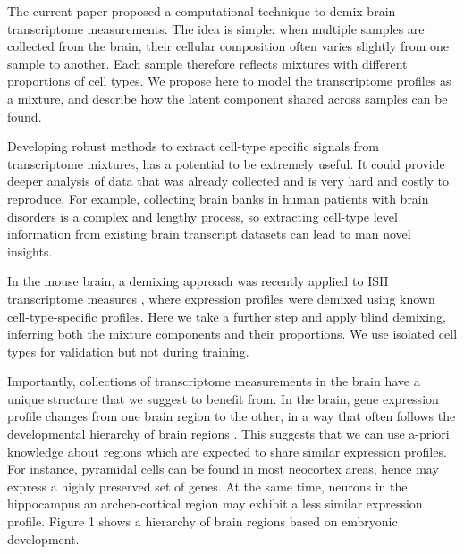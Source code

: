 \documentclass{article} %
\begin{document}
The current paper proposed a computational technique to demix brain transcriptome measurements. The idea is simple: when multiple samples are collected from the brain, their cellular composition often varies slightly from one sample to another. Each sample therefore reflects mixtures with different proportions of cell types. We propose here to model the transcriptome profiles as a mixture, and describe how the latent component shared across samples can be found.

Developing robust methods to extract cell-type specific signals from transcriptome mixtures, has a potential to be extremely useful. It could provide deeper analysis of data that was already collected and is very hard and costly to reproduce. For example, collecting brain banks in human patients with brain disorders is a complex and lengthy process, so extracting cell-type level information from existing brain transcript datasets can lead to man novel insights.

In the mouse brain, a demixing approach was recently applied to ISH transcriptome measures \cite{grange2014cell}, where expression profiles were demixed using known cell-type-specific profiles. Here we take a further step and apply blind demixing, inferring both the mixture components and their proportions. We use isolated cell types for validation but not during training. 


Importantly, collections of transcriptome measurements in the brain have a unique structure that we suggest to benefit from. In the brain, gene expression profile changes from one brain region to the other, in a way that often follows the developmental hierarchy of brain regions \cite{zapala2005}. This suggests that we can use a-priori knowledge about regions which are expected to share similar expression profiles. For instance, pyramidal cells can be found in most neocortex areas, hence may express a highly preserved set of genes. At the same time, neurons in the hippocampus an archeo-cortical region may exhibit a less similar expression profile.  Figure 1 shows a hierarchy of brain regions based on embryonic development. 
\end{document}
